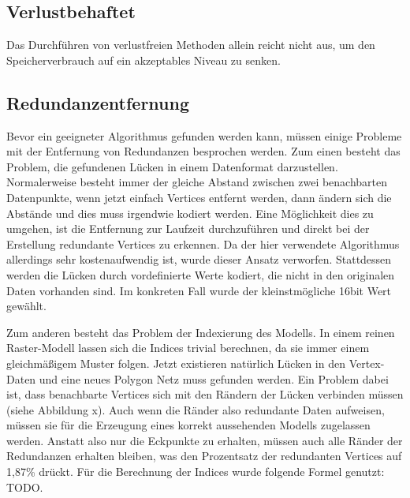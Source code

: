 \subsection{Verlustbehaftet}
Das Durchführen von verlustfreien Methoden allein reicht nicht aus, um den Speicherverbrauch auf ein akzeptables Niveau zu senken.


\subsection{Redundanzentfernung}\label{redundanzberechnung}
Bevor ein geeigneter Algorithmus gefunden werden kann, müssen einige Probleme mit der Entfernung von Redundanzen besprochen werden. Zum einen besteht das Problem, die gefundenen Lücken in einem Datenformat darzustellen. Normalerweise besteht immer der gleiche Abstand zwischen zwei benachbarten Datenpunkte, wenn jetzt einfach Vertices entfernt werden, dann ändern sich die Abstände und dies muss irgendwie kodiert werden. Eine Möglichkeit dies zu umgehen, ist die Entfernung zur Laufzeit durchzuführen und direkt bei der Erstellung redundante Vertices zu erkennen. Da der hier verwendete Algorithmus allerdings sehr kostenaufwendig ist, wurde dieser Ansatz verworfen. Stattdessen werden die Lücken durch vordefinierte Werte kodiert, die nicht in den originalen Daten vorhanden sind. Im konkreten Fall wurde der kleinstmögliche 16bit Wert gewählt.

Zum anderen besteht das Problem der Indexierung des Modells. In einem reinen Raster-Modell lassen sich die Indices trivial berechnen, da sie immer einem gleichmäßigem Muster folgen. Jetzt existieren natürlich Lücken in den Vertex-Daten und eine neues Polygon Netz muss gefunden werden. Ein Problem dabei ist, dass benachbarte Vertices sich mit den Rändern der Lücken verbinden müssen (siehe Abbildung x). Auch wenn die Ränder also redundante Daten aufweisen, müssen sie für die Erzeugung eines korrekt aussehenden Modells zugelassen werden. Anstatt also nur die Eckpunkte zu erhalten, müssen auch alle Ränder der Redundanzen erhalten bleiben, was den Prozentsatz der redundanten Vertices auf 1,87\% drückt. Für die Berechnung der Indices wurde folgende Formel genutzt: TODO.

